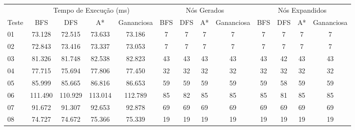 \documentclass[12pt,a4paper]{article}
\begin{document}
\begin{adjustbox}{width={\textwidth}, totalheight={\textheight}, keepaspectratio}
  \begin{tabular}{l cccc cccc cccc}
    \toprule
          & \multicolumn{4}{c}{Tempo de Execução (ms)} & \multicolumn{4}{c}{Nós Gerados} & \multicolumn{4}{c}{Nós Expandidos}                                                                            \\
    \cmidrule(lr){2-5} \cmidrule(lr){6-9} \cmidrule(lr){10-13}
    Teste & BFS                                        & DFS                             & A*                                 & Gananciosa & BFS & DFS & A*  & Gananciosa & BFS & DFS & A*  & Gananciosa \\
    \midrule
    01    & 73.128                                     & 72.515                          & 73.633                             & 73.186     & 7   & 7   & 7   & 7          & 7   & 7   & 7   & 7          \\
    02    & 72.843                                     & 73.416                          & 73.337                             & 73.053     & 7   & 7   & 7   & 7          & 7   & 7   & 7   & 7          \\
    03    & 81.326                                     & 81.748                          & 82.538                             & 82.823     & 43  & 43  & 43  & 43         & 43  & 42  & 43  & 43         \\
    04    & 77.715                                     & 75.694                          & 77.806                             & 77.450     & 32  & 32  & 32  & 32         & 32  & 32  & 32  & 32         \\
    05    & 85.999                                     & 85.665                          & 86.816                             & 86.653     & 59  & 59  & 59  & 59         & 59  & 58  & 59  & 59         \\
    06    & 111.490                                    & 110.929                         & 113.014                            & 112.789    & 85  & 82  & 85  & 85         & 85  & 81  & 85  & 85         \\
    07    & 91.672                                     & 91.307                          & 92.653                             & 92.878     & 69  & 69  & 69  & 69         & 69  & 69  & 69  & 69         \\
    08    & 74.727                                     & 74.672                          & 75.366                             & 75.339     & 19  & 19  & 19  & 19         & 19  & 19  & 19  & 19         \\

\end{tabular}
\end{adjustbox}
\end{document}
